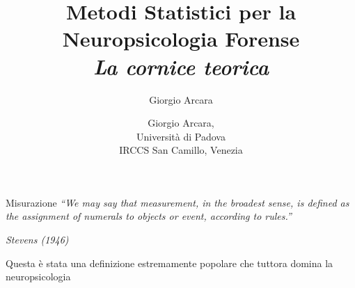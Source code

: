 \documentclass[
  ignorenonframetext,
]{beamer}
\author{Giorgio Arcara}
\date{}
\begin{document}
\begin{frame}
\title{Metodi Statistici per la Neuropsicologia Forense\\ \vspace{1em} \emph{La cornice teorica}}
\author{Giorgio Arcara,\\ Università di Padova \\ IRCCS San Camillo, Venezia}

\maketitle
\end{frame}

\begin{frame}{Misurazione}
\label{misurazione}
\emph{``We may say that measurement, in the broadest sense, is defined
as the assignment of numerals to objects or event, according to
rules.''}

\emph{Stevens (1946)} \pause \vspace{2em}

Questa è stata una definizione estremamente popolare che tuttora domina
la neuropsicologia
\end{frame}
\end{document}
